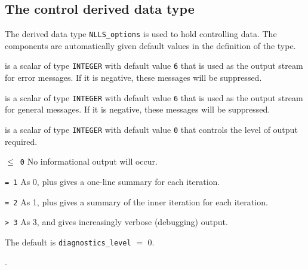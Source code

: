 \documentclass{spec}
\begin{document}
\subsection{The control derived data type}
\label{typecontrol} 

The derived data type {\tt NLLS\_options} 
is used to hold controlling data. The components  are automatically 
given default values in the definition of the type.

\vspace{2mm}

\begin{description}

 is a scalar of type {\tt INTEGER} with default value {\tt 6} that
is used as the output stream for error messages. If it is negative, these
messages will be suppressed.  

 is a scalar of type {\tt INTEGER} with default value {\tt 6}
that is used as the output stream for general messages. If it is negative, these messages will be suppressed. 

 is a scalar of type {\tt INTEGER} with default value {\tt 0} that 
controls the level of output required. 
\begin{description} 
\item{\tt $\leq$ 0} No informational output will occur.
\item{\tt = 1} As 0, plus gives a one-line summary for each iteration.
\item{\tt = 2} As 1, plus gives a summary of the inner iteration for each iteration.
\item{\tt > 3} As 3, and gives increasingly verbose (debugging) output.
\end{description}
The default is {\tt diagnostics\_level} $=$ 0.
\end{description}

.
\end{document}
